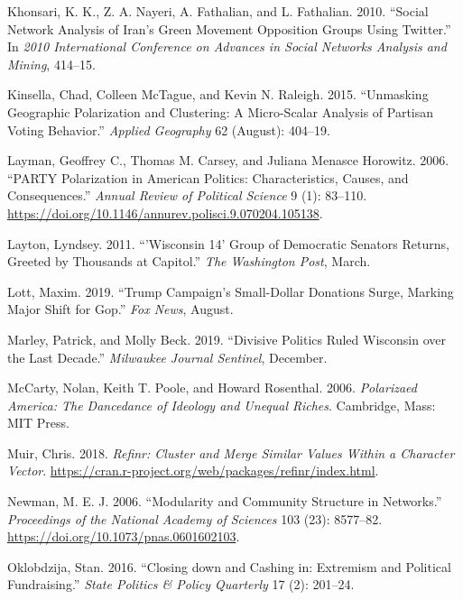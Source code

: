 \documentclass[12pt,]{article}
\begin{document}
\leavevmode\hypertarget{ref-khonsari2010}{}%
Khonsari, K. K., Z. A. Nayeri, A. Fathalian, and L. Fathalian. 2010.
``Social Network Analysis of Iran's Green Movement Opposition Groups
Using Twitter.'' In \emph{2010 International Conference on Advances in
Social Networks Analysis and Mining}, 414--15.

\leavevmode\hypertarget{ref-kinsella2015}{}%
Kinsella, Chad, Colleen McTague, and Kevin N. Raleigh. 2015. ``Unmasking
Geographic Polarization and Clustering: A Micro-Scalar Analysis of
Partisan Voting Behavior.'' \emph{Applied Geography} 62 (August):
404--19.

\leavevmode\hypertarget{ref-layman2006}{}%
Layman, Geoffrey C., Thomas M. Carsey, and Juliana Menasce Horowitz.
2006. ``PARTY Polarization in American Politics: Characteristics,
Causes, and Consequences.'' \emph{Annual Review of Political Science} 9
(1): 83--110.
\url{https://doi.org/10.1146/annurev.polisci.9.070204.105138}.

\leavevmode\hypertarget{ref-layton2011}{}%
Layton, Lyndsey. 2011. ``'Wisconsin 14' Group of Democratic Senators
Returns, Greeted by Thousands at Capitol.'' \emph{The Washington Post},
March.

\leavevmode\hypertarget{ref-lott2019}{}%
Lott, Maxim. 2019. ``Trump Campaign's Small-Dollar Donations Surge,
Marking Major Shift for Gop.'' \emph{Fox News}, August.

\leavevmode\hypertarget{ref-marley2019}{}%
Marley, Patrick, and Molly Beck. 2019. ``Divisive Politics Ruled
Wisconsin over the Last Decade.'' \emph{Milwaukee Journal Sentinel},
December.

\leavevmode\hypertarget{ref-mccarty2006}{}%
McCarty, Nolan, Keith T. Poole, and Howard Rosenthal. 2006.
\emph{Polarizaed America: The Dancedance of Ideology and Unequal
Riches}. Cambridge, Mass: MIT Press.

\leavevmode\hypertarget{ref-refinr}{}%
Muir, Chris. 2018. \emph{Refinr: Cluster and Merge Similar Values Within
a Character Vector}.
\url{https://cran.r-project.org/web/packages/refinr/index.html}.

\leavevmode\hypertarget{ref-newman2006}{}%
Newman, M. E. J. 2006. ``Modularity and Community Structure in
Networks.'' \emph{Proceedings of the National Academy of Sciences} 103
(23): 8577--82. \url{https://doi.org/10.1073/pnas.0601602103}.

\leavevmode\hypertarget{ref-oklobzija}{}%
Oklobdzija, Stan. 2016. ``Closing down and Cashing in: Extremism and
Political Fundraising.'' \emph{State Politics \& Policy Quarterly} 17
(2): 201--24.
\end{document}
